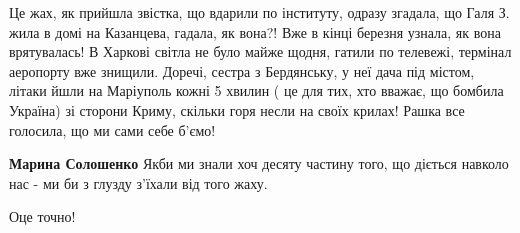  
 
 
 
 

\qqSecCmt


Це жах, як прийшла звістка, що вдарили по інституту, одразу згадала, що Галя З.
жила в домі на Казанцева, гадала, як вона?! Вже в кінці березня узнала, як вона
врятувалась! В Харкові світла не було майже щодня, гатили по телевежі, термінал
аеропорту вже знищили. Доречі, сестра з Бердянську, у неї дача під містом,
літаки йшли на Маріуполь кожні 5 хвилин ( це для тих, хто вважає, що бомбила
Україна) зі сторони Криму, скільки горя несли на своїх крилах! Рашка все
голосила, що ми сами себе б'ємо!

\begin{itemize} %
\textbf{Марина Солошенко} Якби ми знали хоч десяту частину того, що діється навколо нас - ми би з глузду з'їхали від того жаху.

Оце точно!
\end{itemize} %
